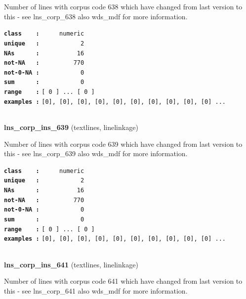\documentclass[]{article}
\begin{document}
Number of lines with corpus code 638 which have changed from last
version to this - see lns\_corp\_638 also wds\_mdf for more information.

\textbf{\texttt{class\ \ \ \ :}} \texttt{~~~~~numeric}\\
\textbf{\texttt{unique\ \ \ :}} \texttt{~~~~~~~~~~~2}\\
\textbf{\texttt{NAs\ \ \ \ \ \ :}} \texttt{~~~~~~~~~~16}\\
\textbf{\texttt{not-NA\ \ \ :}} \texttt{~~~~~~~~~770}\\
\textbf{\texttt{not-0-NA\ :}} \texttt{~~~~~~~~~~~0}\\
\textbf{\texttt{sum\ \ \ \ \ \ :}} \texttt{~~~~~~~~~~~0}\\
\textbf{\texttt{range\ \ \ \ :}}
\texttt{{[}\ 0\ {]}\ ...\ {[}\ 0\ {]}}\\
\textbf{\texttt{examples\ :}}
\texttt{{[}0{]},\ {[}0{]},\ {[}0{]},\ {[}0{]},\ {[}0{]},\ {[}0{]},\ {[}0{]},\ {[}0{]},\ {[}0{]},\ {[}0{]}\ ...}\\

~

\textbf{lns\_corp\_ins\_639} (textlines, linelinkage)

Number of lines with corpus code 639 which have changed from last
version to this - see lns\_corp\_639 also wds\_mdf for more information.

\textbf{\texttt{class\ \ \ \ :}} \texttt{~~~~~numeric}\\
\textbf{\texttt{unique\ \ \ :}} \texttt{~~~~~~~~~~~2}\\
\textbf{\texttt{NAs\ \ \ \ \ \ :}} \texttt{~~~~~~~~~~16}\\
\textbf{\texttt{not-NA\ \ \ :}} \texttt{~~~~~~~~~770}\\
\textbf{\texttt{not-0-NA\ :}} \texttt{~~~~~~~~~~~0}\\
\textbf{\texttt{sum\ \ \ \ \ \ :}} \texttt{~~~~~~~~~~~0}\\
\textbf{\texttt{range\ \ \ \ :}}
\texttt{{[}\ 0\ {]}\ ...\ {[}\ 0\ {]}}\\
\textbf{\texttt{examples\ :}}
\texttt{{[}0{]},\ {[}0{]},\ {[}0{]},\ {[}0{]},\ {[}0{]},\ {[}0{]},\ {[}0{]},\ {[}0{]},\ {[}0{]},\ {[}0{]}\ ...}\\

~

\textbf{lns\_corp\_ins\_641} (textlines, linelinkage)

Number of lines with corpus code 641 which have changed from last
version to this - see lns\_corp\_641 also wds\_mdf for more information.
\end{document}
